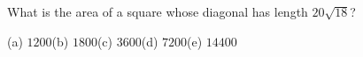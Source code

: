 What is the area of a square whose diagonal has length $20\sqrt{18}$?

(a) $1200$\quad (b) $1800$\quad (c) $3600$\quad (d) $7200$\quad (e) $14400$
